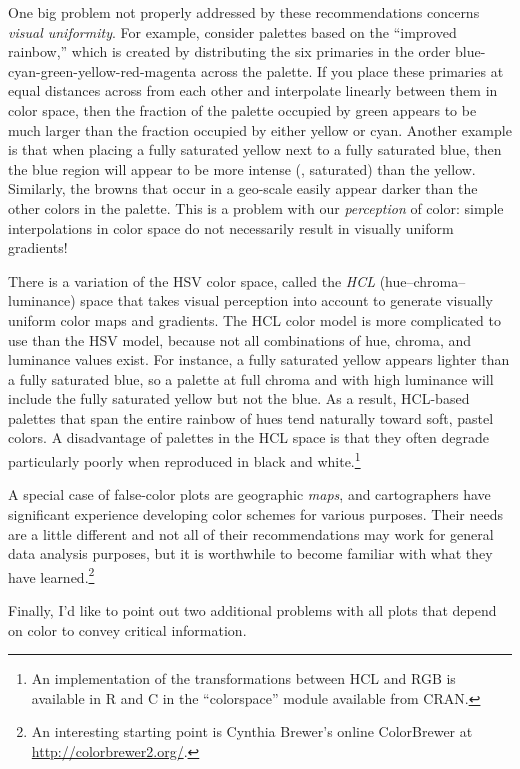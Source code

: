 One big problem not properly addressed by these recommendations
concerns \emph{visual uniformity}.  For example, consider palettes
based on the ``improved rainbow,'' which is created by distributing
the six primaries in the order blue-cyan-green-yellow-red-magenta
across the palette. If you place these primaries at equal distances
across from each other and interpolate linearly between them in color
space, then the fraction of the palette occupied by green appears to
be much larger than the fraction occupied by either yellow or cyan.
Another example is that when placing a fully saturated yellow next to
a fully saturated blue, then the blue region will appear to be more
intense (\ie, saturated) than the yellow. Similarly, the browns that
occur in a geo-scale easily appear darker than the other colors in the
palette. This is a problem with our \emph{perception} of color: simple
interpolations in color space do not necessarily result in visually
uniform gradients!

There is a variation of the HSV color space, called the \emph{HCL}
(hue--chroma--luminance) space  that takes visual perception into
account to generate visually uniform color maps and gradients.  The
HCL color model is more complicated to use than the HSV model, because
not all combinations of hue, chroma, and luminance values exist.  For
instance, a fully saturated yellow appears lighter than a fully
saturated blue, so a palette at full chroma and with high luminance
will include the fully saturated yellow but not the blue. As a result,
HCL-based palettes that span the entire rainbow of hues tend naturally
toward soft, pastel colors.  A disadvantage of palettes in the HCL
space is that they often degrade particularly poorly when reproduced
in black and white.\footnote{An implementation of the transformations
  between HCL and RGB is available in R and C in the ``colorspace''
  module available from CRAN.}

A special case of false-color plots are geographic \emph{maps}, and
cartographers have significant experience developing color schemes for
various purposes. Their needs are a little different and not all of
their recommendations may work for general data analysis purposes, but
it is worthwhile to become familiar with what they have
learned.\footnote{An interesting starting point is Cynthia Brewer's
  online ColorBrewer at \url{http://colorbrewer2.org/}.}

Finally, I'd like to point out two additional problems with all
plots that depend on color to convey critical information.


